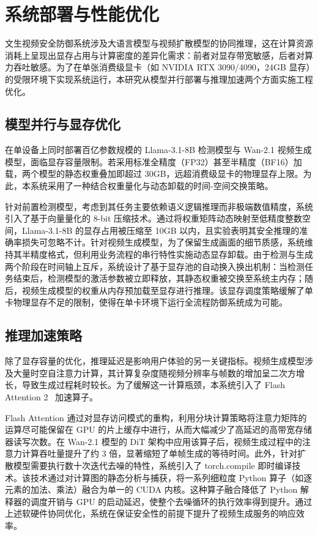 \section{系统部署与性能优化}

文生视频安全防御系统涉及大语言模型与视频扩散模型的协同推理，这在计算资源消耗上呈现出显存占用与计算密度的差异化需求：前者对显存带宽敏感，后者对算力吞吐敏感。为了在单张消费级显卡（如 NVIDIA RTX 3090/4090，24GB 显存）的受限环境下实现系统运行，本研究从模型并行部署与推理加速两个方面实施工程优化。

\subsection{模型并行与显存优化}

在单设备上同时部署百亿参数规模的 Llama-3.1-8B 检测模型与 Wan-2.1 视频生成模型，面临显存容量限制。若采用标准全精度（FP32）甚至半精度（BF16）加载，两个模型的静态权重叠加即超过 30GB，远超消费级显卡的物理显存上限。为此，本系统采用了一种结合权重量化与动态卸载的时间-空间交换策略。

针对前置检测模型，考虑到其任务主要依赖语义逻辑推理而非极端数值精度，系统引入了基于向量量化的 8-bit 压缩技术。通过将权重矩阵动态映射至低精度整数空间，Llama-3.1-8B 的显存占用被压缩至 10GB 以内，且实验表明其安全推理的准确率损失可忽略不计。针对视频生成模型，为了保留生成画面的细节质感，系统维持其半精度格式，但利用业务流程的串行特性实施动态显存卸载。由于检测与生成两个阶段在时间轴上互斥，系统设计了基于显存池的自动换入换出机制：当检测任务结束后，检测模型的激活参数被立即释放，其静态权重被交换至系统主内存；随后，视频生成模型的权重从内存预加载至显存进行推理。该显存调度策略缓解了单卡物理显存不足的限制，使得在单卡环境下运行全流程防御系统成为可能。

\subsection{推理加速策略}

除了显存容量的优化，推理延迟是影响用户体验的另一关键指标。视频生成模型涉及大量时空自注意力计算，其计算复杂度随视频分辨率与帧数的增加呈二次方增长，导致生成过程耗时较长。为了缓解这一计算瓶颈，本系统引入了 Flash Attention 2~\cite{dao2022flashattention} 加速算子。

Flash Attention 通过对显存访问模式的重构，利用分块计算策略将注意力矩阵的运算尽可能保留在 GPU 的片上缓存中进行，从而大幅减少了高延迟的高带宽存储器读写次数。在 Wan-2.1 模型的 DiT 架构中应用该算子后，视频生成过程中的注意力计算吞吐量提升了约 3 倍，显著缩短了单帧生成的等待时间。此外，针对扩散模型需要执行数十次迭代去噪的特性，系统引入了 torch.compile 即时编译技术。该技术通过对计算图的静态分析与捕获，将一系列细粒度 Python 算子（如逐元素的加法、乘法）融合为单一的 CUDA 内核。这种算子融合降低了 Python 解释器的调度开销与 GPU 的启动延迟，使整个去噪循环的执行效率得到提升。通过上述软硬件协同优化，系统在保证安全性的前提下提升了视频生成服务的响应效率。

